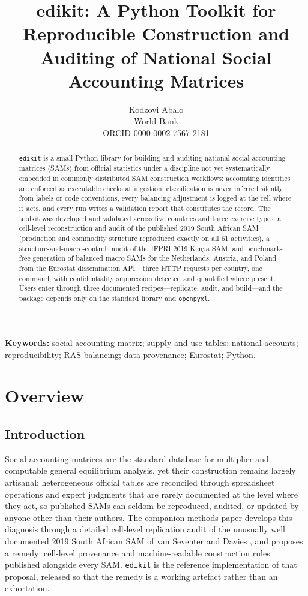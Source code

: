 \documentclass[11pt,a4paper]{article}
\title{edikit: A Python Toolkit for Reproducible Construction and
Auditing of National Social Accounting Matrices}
\author{Kodzovi Abalo\\
\normalsize World Bank\\
\normalsize ORCID 0000-0002-7567-2181}
\date{}
\begin{document}
\maketitle

\begin{abstract}
\noindent
\texttt{edikit} is a small Python library for building and auditing
national social accounting matrices (SAMs) from official statistics
under a discipline not yet systematically embedded in commonly
distributed SAM construction workflows: accounting identities are
enforced as executable checks at ingestion, classification is never
inferred silently from labels or code conventions, every balancing
adjustment is logged at
the cell where it acts, and every run writes a validation report that
constitutes the record. The toolkit was developed and validated across five
countries and three exercise types: a cell-level reconstruction
and audit of the
published 2019 South African SAM (production and commodity structure
reproduced exactly on all 61 activities), a structure-and-macro-controls
audit of the IFPRI 2019 Kenya SAM, and benchmark-free generation of
balanced macro SAMs for the Netherlands, Austria, and Poland from the
Eurostat dissemination API---three HTTP requests per country, one
command, with confidentiality suppression detected and quantified where
present. Users enter through three documented recipes---replicate,
audit, and build---and the package depends only on the standard library
and \texttt{openpyxl}.
\end{abstract}

\vspace{0.5em}
\noindent\textbf{Keywords:} social accounting matrix; supply and use
tables; national accounts; reproducibility; RAS balancing; data
provenance; Eurostat; Python.

\section{Overview}

\subsection{Introduction}

Social accounting matrices are the standard database for multiplier and
computable general equilibrium analysis, yet their construction remains
largely artisanal: heterogeneous official tables are reconciled through
spreadsheet operations and expert judgments that are rarely documented
at the level where they act, so published SAMs can seldom be reproduced,
audited, or updated by anyone other than their authors. The companion
methods paper \cite{abalo2026} develops this diagnosis through a
detailed cell-level replication audit of the unusually well documented
2019 South African SAM of van Seventer and Davies \cite{vanseventer2023}, and
proposes a remedy: cell-level provenance and machine-readable
construction rules published alongside every SAM. \texttt{edikit} is the
reference implementation of that proposal, released so that the remedy
is a working artefact rather than an exhortation.
\end{document}
